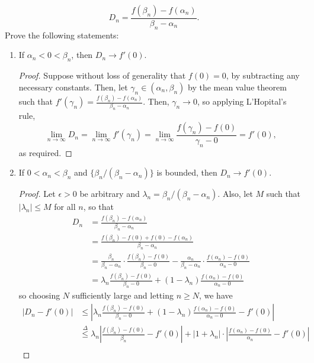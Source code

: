 \begin{enumerate}[1.]
    \[
        D_n = \frac{f(\beta_n) - f(\alpha_n)}{\beta_n - \alpha_n}.
    \]
    Prove the following statements:
    \begin{enumerate}
    \item If $\alpha_n < 0 < \beta_n$, then $D_n \to f'(0)$.
        \begin{proof}
            Suppose without loss of generality that $f(0) = 0$, by subtracting any necessary constants. Then, let $\gamma_n \in (\alpha_n, \beta_n)$ by the mean value theorem such that $f'(\gamma_n) = \frac{f(\beta_n) - f(\alpha_n)}{\beta_n - \alpha_n}$. Then, $\gamma_n \to 0$, so applying L'Hopital's rule,
            \[
                \lim_{n \to \infty} D_n = \lim_{n \to \infty} f'(\gamma_n) = \lim_{n \to \infty} \frac{f(\gamma_n) - f(0)}{\gamma_n - 0} = f'(0),
            \]
            as required.
        \end{proof}
    \item If $0 < \alpha_n < \beta_n$ and $\{\beta_n/(\beta_n - \alpha_n)\}$ is bounded, then $D_n \to f'(0)$.
        \begin{proof}
            Let $\epsilon > 0$ be arbitrary and $\lambda_n = \beta_n/(\beta_n - \alpha_n)$. Also, let $M$ such that $|\lambda_n| \le M$ for all $n$, so that
            \begin{align*}
                D_n &= \frac{f(\beta_n) - f(\alpha_n)}{\beta_n - \alpha_n} \\
                    &= \frac{f(\beta_n) - f(0) + f(0) - f(\alpha_n)}{\beta_n - \alpha_n} \\
                    &= \frac{\beta_n}{\beta_n - \alpha_n} \cdot \frac{f(\beta_n) - f(0)}{\beta_n - 0} - \frac{\alpha_n}{\beta_n - \alpha_n} \cdot \frac{f(\alpha_n) - f(0)}{\alpha_n - 0} \\
                    &= \lambda_n \frac{f(\beta_n) - f(0)}{\beta_n - 0} + (1 - \lambda_n) \frac{f(\alpha_n) - f(0)}{\alpha_n - 0}
            \end{align*}
            so choosing $N$ sufficiently large and letting $n \ge N$, we have
            \begin{align*}
                |D_n - f'(0)| &\le \left| \lambda_n \frac{f(\beta_n) - f(0)}{\beta_n - 0} + (1 - \lambda_n) \frac{f(\alpha_n) - f(0)}{\alpha_n - 0} - f'(0) \right| \\
                    &\overset{\Delta}{\le} \lambda_n \left| \frac{f(\beta_n) - f(0)}{\beta_n} - f'(0) \right| + |1 + \lambda_n| \cdot \left| \frac{f(\alpha_n) - f(0)}{\alpha_n} - f'(0) \right| \\

\end{align*}
\end{proof}
\end{enumerate}
\end{enumerate}
